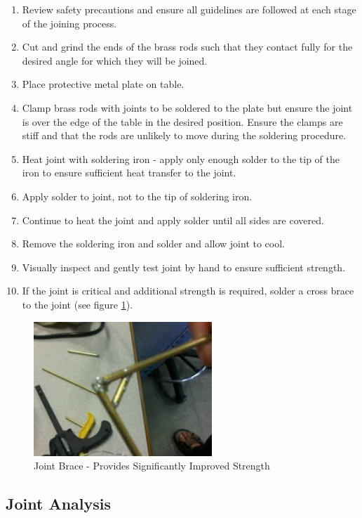 \begin{enumerate}
\item Review safety precautions and ensure all guidelines are followed at each stage of the joining process.
\item Cut and grind the ends of the brass rods such that they contact fully for the desired angle for which they will be joined.
\item Place protective metal plate on table.
\item Clamp brass rods with joints to be soldered to the plate but ensure the joint is over the edge of the table in the desired position. Ensure the clamps are stiff and that the rods are unlikely to move during the soldering procedure.
\item Heat joint with soldering iron - apply only enough solder to the tip of the iron to ensure sufficient heat transfer to the joint.
\item Apply solder to joint, not to the tip of soldering iron.
\item Continue to heat the joint and apply solder until all sides are covered. 
\item Remove the soldering iron and solder and allow joint to cool.
\item Visually inspect and gently test joint by hand to ensure sufficient strength.
\item If the joint is critical and additional strength is required, solder a cross brace to the joint (see figure \ref{fig:solder_brace}).
\end{enumerate}

 \begin{figure}[hp]
    \centering
    \includegraphics[width=0.6\textwidth]{images/solder_3}
    \caption{Joint Brace - Provides Significantly Improved Strength}
    \label{fig:solder_brace}
\end{figure}

\subsection{Joint Analysis} 

